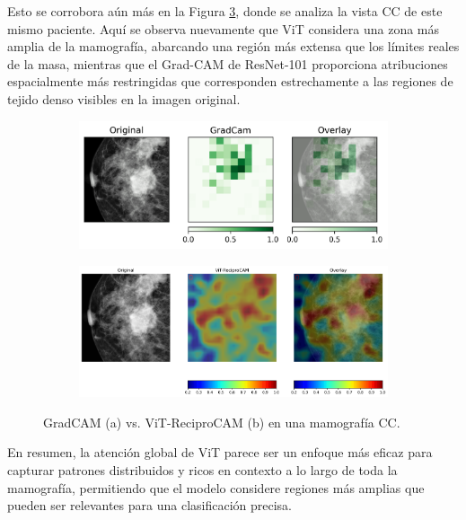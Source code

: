 \documentclass[a4paper,10pt]{book}
\begin{document}
Esto se corrobora aún más en la Figura \ref{fig:grad_vs_vit_cc}, donde se analiza la vista CC de este mismo paciente. Aquí se observa nuevamente que ViT considera una zona más amplia de la mamografía, abarcando una región más extensa que los límites reales de la masa, mientras que el Grad-CAM de ResNet-101 proporciona atribuciones espacialmente más restringidas que corresponden estrechamente a las regiones de tejido denso visibles en la imagen original.



\begin{figure}[h!]
    \centering
    \begin{subfigure}[c]{0.48\textwidth}
        \centering
        \includegraphics[width=\textwidth]{reports//assets/D2-0138_CC-R_Resnet.png}
        \caption{}
        \label{fig:cc_cam}
    \end{subfigure}
    \begin{subfigure}[c]{0.48\textwidth}
        \centering
        \includegraphics[width=\textwidth]{reports//assets/D2-0138_CC-R.png}
        \caption{}
        \label{fig:cc_reci}
    \end{subfigure}
     \caption[GradCAM vs. ViT-ReciproCAM (vista CC)]{GradCAM (a) vs. ViT-ReciproCAM (b) en una mamografía CC.}
    \label{fig:grad_vs_vit_cc}
\end{figure}

En resumen, la atención global de ViT parece ser un enfoque más eficaz para capturar patrones distribuidos y ricos en contexto a lo largo de toda la mamografía, permitiendo que el modelo considere regiones más amplias que pueden ser relevantes para una clasificación precisa.
\end{document}
